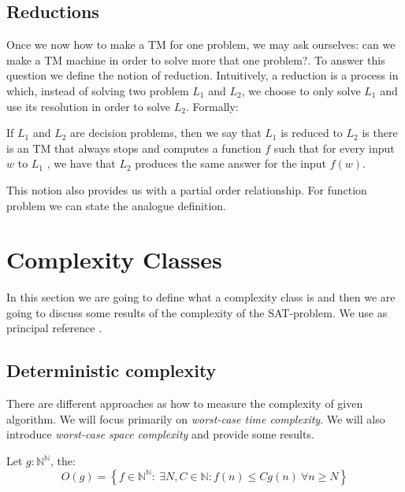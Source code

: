   
\subsection{Reductions}

Once we now how to make a TM for one problem, we may ask ourselves: can we make a TM machine in order to solve more that one problem?. To answer this question we define the notion of reduction. Intuitively, a reduction is a process in which, instead of solving two problem $L_1$ and $L_2$, we choose to only solve $L_1$ and use its resolution in order to solve $L_2$. Formally:

\begin{definition}
If $L_1$ and $L_2$ are decision problems, then we say that $L_1$ is reduced to $L_2$ is there is an TM that always stops and computes a function $f$ such that for every input $w$ to $L_1$ , we have that $L_2$ produces the same answer for the input $f (w )$.  
\end{definition}


This notion also provides us with a partial order relationship. For function problem we can state the analogue definition. 


\section{Complexity Classes}
\label{sec:complexity}

In this section we are going to define what a complexity class is and then we are going to discuss some results of the complexity of the SAT-problem. We use as principal reference \cite{arora2009computational}.

\subsection{Deterministic complexity}
\label{sub:detcomp}
There are different approaches as how to measure the complexity of given algorithm. We will focus primarily on \emph{worst-case time complexity}. We will also introduce \emph{worst-case space complexity} and provide some results.

\begin{definition}
  Let $g:\mathbb{N}^\mathbb{N}$, the:
  $$O(g) = \left\{ f\in \mathbb{N}^\mathbb{N} :\ \exists N,C \in \mathbb{N} : f(n) \le Cg(n) \ \forall  n \ge N\right\}$$
\end{definition}

